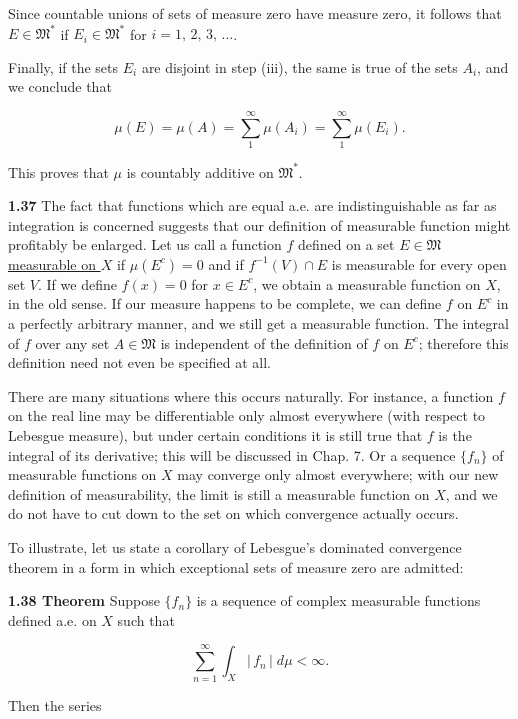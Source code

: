 \documentclass[11pt]{article}
\begin{document}
Since countable unions of sets of measure zero have measure zero, it follows that \(E\in\mathfrak{M}^{* }\) if \(E_{i}\in\mathfrak{M}^{ *}\) for \(i=1,\,2,\,3,\,\ldots\).

Finally, if the sets \(E_{i}\) are disjoint in step (iii), the same is true of the sets \(A_{i}\), and we conclude that

\[\mu(E)=\mu(A)=\sum\limits_{1}^{\infty}\mu(A_{i})=\sum\limits_{1}^{\infty}\mu(E_{i}).\]

This proves that \(\mu\) is countably additive on \(\mathfrak{M}^{*}\).

\textbf{\textbf{1.37}} The fact that functions which are equal a.e. are indistinguishable as far as integration is concerned suggests that our definition of measurable function might profitably be enlarged. Let us call a function \(f\) defined on a set \(E \in \mathfrak{M}\) \uline{measurable on \(X\)} if \(\mu(E^{c}) = 0\) and if \(f^{-1}(V) \cap E\) is measurable for every open set \(V\). If we define \(f(x) = 0\) for \(x \in E^{c}\), we obtain a measurable function on \(X\), in the old sense. If our measure happens to be complete, we can define \(f\) on \(E^{c}\) in a perfectly arbitrary manner, and we still get a measurable function. The integral of \(f\) over any set \(A \in \mathfrak{M}\) is independent of the definition of \(f\) on \(E^{c}\); therefore this definition need not even be specified at all.

There are many situations where this occurs naturally. For instance, a function \(f\) on the real line may be differentiable only almost everywhere (with respect to Lebesgue measure), but under certain conditions it is still true that \(f\) is the integral of its derivative; this will be discussed in Chap. 7. Or a sequence \(\{f_{n}\}\) of measurable functions on \(X\) may converge only almost everywhere; with our new definition of measurability, the limit is still a measurable function on \(X\), and we do not have to cut down to the set on which convergence actually occurs.

To illustrate, let us state a corollary of Lebesgue's dominated convergence theorem in a form in which exceptional sets of measure zero are admitted:

\label{org8011ce8}
\textbf{\textbf{1.38 Theorem}} Suppose \(\{f_{n}\}\) is a sequence of complex measurable functions defined a.e. on \(X\) such that

\[
\sum\limits_{n=1}^{\infty}\int_{X}|\,f_{n}\,|\;d\mu<\infty.\tag{1}
\]

Then the series
\end{document}
